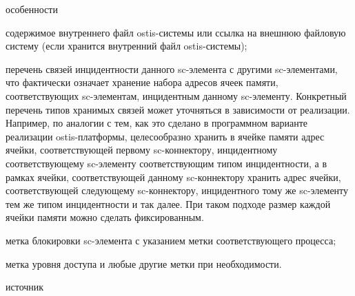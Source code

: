 \begin{scnsubstruct}
\begin{scnrelfromset}{особенности}
{\begin{scnitemize}
				\item содержимое внутреннего файл ostis-системы или ссылка на внешнюю файловую систему (если хранится внутренний файл ostis-системы);
				\item перечень связей инцидентности данного sc-элемента с другими sc-элементами, что фактически означает хранение набора адресов ячеек памяти, соответствующих sc-элементам, инцидентным данному sc-элементу. Конкретный перечень типов хранимых связей может уточняться в зависимости от реализации. Например, по аналогии с тем, как это сделано в программном варианте реализации ostis-платформы, целесообразно хранить в ячейке памяти адрес ячейки, соответствующей первому sc-коннектору, инцидентному соответствующему sc-элементу соответствующим типом инцидентности, а в рамках ячейки, соответствующей данному sc-коннектору хранить адрес ячейки, соответствующей следующему sc-коннектору, инцидентного тому же sc-элементу тем же типом инцидентности и так далее. При таком подходе размер каждой ячейки памяти можно сделать фиксированным.
				\item метка блокировки sc-элемента с указанием метки соответствующего процесса;
				\item метка уровня доступа и любые другие метки при необходимости.
		\end{scnitemize}}
        \begin{scnindent}
            \begin{scnrelfromlist}{источник}
            \end{scnrelfromlist}
        \end{scnindent}

\end{scnrelfromset}
\end{scnsubstruct}
